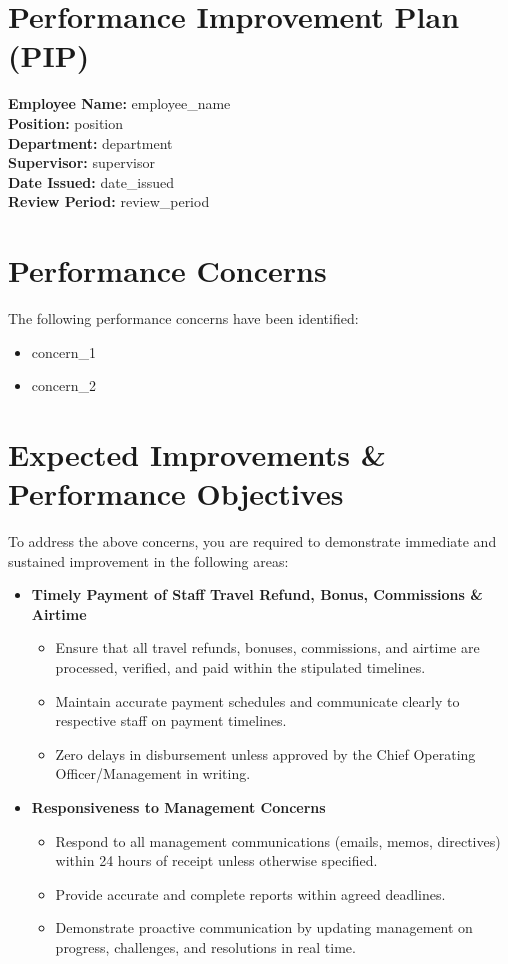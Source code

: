\documentclass[a4paper,12pt]{article}
\begin{document}
\section*{Performance Improvement Plan (PIP)}
\textbf{Employee Name:} {{employee_name}} \\
\textbf{Position:} {{position}} \\
\textbf{Department:} {{department}} \\
\textbf{Supervisor:} {{supervisor}} \\
\textbf{Date Issued:} {{date_issued}} \\
\textbf{Review Period:} {{review_period}} \\

\section*{Performance Concerns}
The following performance concerns have been identified:
\begin{itemize}
    \item {{concern_1}}
    \item {{concern_2}}
\end{itemize}

\section*{Expected Improvements \& Performance Objectives}
To address the above concerns, you are required to demonstrate immediate and sustained improvement in the following areas:
\begin{itemize}
    \item \textbf{Timely Payment of Staff Travel Refund, Bonus, Commissions \& Airtime}
    \begin{itemize}
        \item Ensure that all travel refunds, bonuses, commissions, and airtime are processed, verified, and paid within the stipulated timelines.
        \item Maintain accurate payment schedules and communicate clearly to respective staff on payment timelines.
        \item Zero delays in disbursement unless approved by the Chief Operating Officer/Management in writing.
    \end{itemize}
    \item \textbf{Responsiveness to Management Concerns}
    \begin{itemize}
        \item Respond to all management communications (emails, memos, directives) within 24 hours of receipt unless otherwise specified.
        \item Provide accurate and complete reports within agreed deadlines.
        \item Demonstrate proactive communication by updating management on progress, challenges, and resolutions in real time.
    \end{itemize}
\end{itemize}
\end{document}
